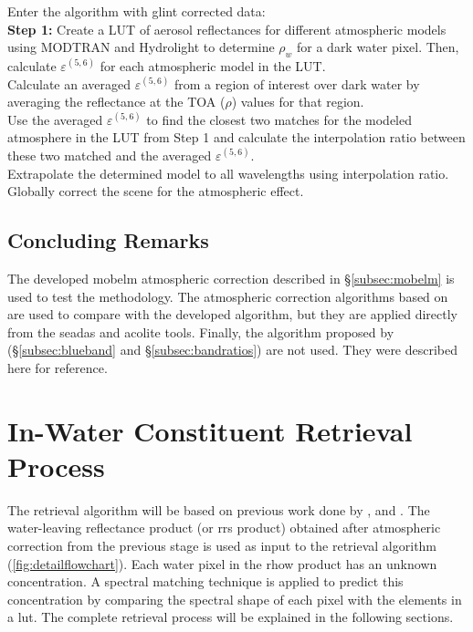 Enter the algorithm with glint corrected data:\\
{\bf Step 1:} Create a LUT of aerosol reflectances for different atmospheric models using MODTRAN and Hydrolight to determine $\rho_w$ for a dark water pixel. Then, calculate $\varepsilon^{(5,6)}$ for each atmospheric model in the LUT. \\
 Calculate an averaged $\varepsilon^{(5,6)}$ from a region of interest over dark water by averaging the reflectance at the TOA ($\rho$) values for that region.\\ 
 Use the averaged $\varepsilon^{(5,6)}$ to find the closest two matches for the modeled atmosphere in the LUT from Step 1 and calculate the interpolation ratio between these two matched and the averaged $\varepsilon^{(5,6)}$. \\
 Extrapolate the determined model to all wavelengths using interpolation ratio. \\
 Globally correct the scene for the atmospheric effect. \\

\subsection{Concluding Remarks}
The developed \gls{mobelm} atmospheric correction described in \S\ref{subsec:mobelm} is used to test the methodology. The atmospheric correction algorithms based on \citet{Gordon:1994} are used to compare with the developed algorithm, but they are applied directly from the \gls{seadas} and \gls{acolite} tools. Finally, the algorithm proposed by \citet{GeraceThesis} (\S\ref{subsec:blueband} and \S\ref{subsec:bandratios}) are not used. They were described here for reference.
\section{In-Water Constituent Retrieval Process}
\label{sec:retrieval}
The retrieval algorithm will be based on previous work done by \citet{Raqueno:2000}, \citet{Gerace:2013} and \citet{Concha2013IGARSS}. The water-leaving reflectance product (or \acrshort{rrs} product) obtained after atmospheric correction from the previous stage is used as input to the retrieval algorithm (\autoref{fig:detailflowchart}). Each water pixel in the \acrfull{rhow} product has an unknown concentration. A spectral matching technique is applied to predict this concentration by comparing the spectral shape of each pixel with the elements in a \gls{lut}. The complete retrieval process will be explained in the following sections. 
